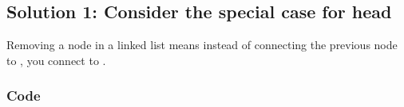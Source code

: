 \documentclass[letterpaper,12pt,english]{book}
\begin{document}
\subsection{Solution 1: Consider the special case for head}
\label{\detokenize{Linked_List/02_LL_203_Remove_Linked_List_Elements:solution-1-consider-the-special-case-for-head}}
\sphinxAtStartPar
Removing a node  in a linked list means instead of connecting the previous node  to , you connect  to .


\subsubsection{Code}
\label{\detokenize{Linked_List/02_LL_203_Remove_Linked_List_Elements:code}}
\end{document}
